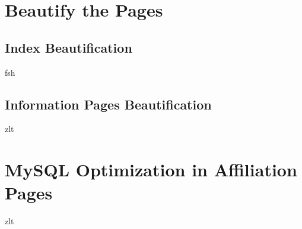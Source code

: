 \documentclass{book}
\begin{document}
\chapter {Beautify the Pages}

\section {Index Beautification}

fsh

\section {Information Pages Beautification}

zlt


\chapter {MySQL Optimization in Affiliation Pages}

zlt
\end{document}
